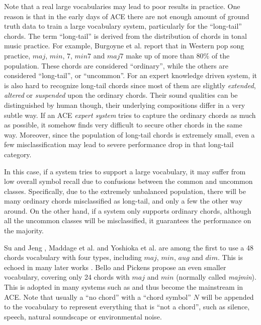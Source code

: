 Note that a real large vocabularies may lead to poor results in practice. One reason is that in the early days of ACE there are not enough amount of ground truth data to train a large vocabulary system, particularly for the ``long-tail'' chords. The term ``long-tail'' is derived from the distribution of chords in tonal music practice. For example, Burgoyne et al. \cite{burgoyne2011expert} report that in Western pop song practice, $maj$, $min$, $7$, $min7$ and $maj7$ make up of more than $80\%$ of the population. These chords are considered ``ordinary'', while the others are considered ``long-tail'', or ``uncommon''. For an expert knowledge driven system, it is also hard to recognize long-tail chords since most of them are slightly {\it extended}, {\it altered} or {\it suspended} upon the ordinary chords. Their sound qualities can be distinguished by human though, their underlying compositions differ in a very subtle way. If an ACE {\it expert system} tries to capture the ordinary chords as much as possible, it somehow finds very difficult to secure other chords in the same way. Moreover, since the population of long-tail chords is extremely small, even a few misclassification may lead to severe performance drop in that long-tail category.

In this case, if a system tries to support a large vocabulary, it may suffer from low overall symbol recall due to confusions between the common and uncommon classes. Specifically, due to the extremely unbalanced population, there will be many ordinary chords misclassified as long-tail, and only a few the other way around. On the other hand, if a system only supports ordinary chords, although all the uncommon classes will be misclassified, it guarantees the performance on the majority. \cite{deng2016hybrid}

Su and Jeng \cite{su2001multi}, Maddage et al. \cite{maddage2004content} and Yoshioka et al. \cite{yoshioka2004automatic} are among the first to use a 48 chords vocabulary with four types, including $maj$, $min$, $aug$ and $dim$. This is echoed in many later works \cite{harte2005automatic,catteau2007probabilistic,burgoyne2007cross,su2001multi,papadopoulos2008simultaneous}. Bello and Pickens \cite{bello2005robust} propose an even smaller vocabulary, covering only 24 chords with $maj$ and $min$ (normally called {\it majmin}). This is adopted in many systems such as \cite{ryynanen2008automatic,weil2008hmm,khadkevich2009use,weller2009structured,ni2012end,cho2010exploring,humphrey2012rethinking} and thus become the mainstream in ACE. Note that usually a ``no chord'' with a ``chord symbol'' $N$ will be appended to the vocabulary to represent everything that is ``not a chord'', such as silence, speech, natural soundscape or environmental noise.

